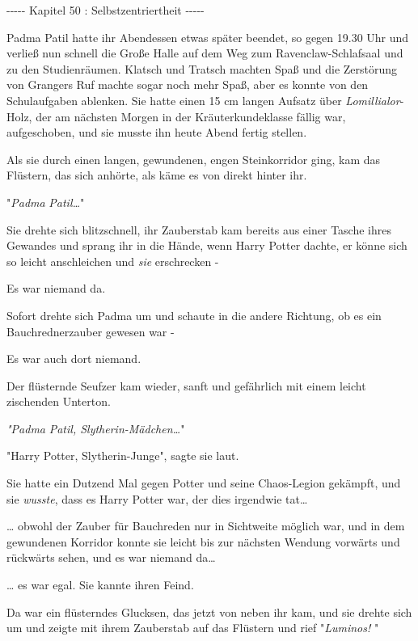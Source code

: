 

\hypertarget{selbstzentriertheit}{%

-\/-\/-\/-\/- Kapitel 50 : Selbstzentriertheit -\/-\/-\/-\/-

Padma Patil hatte ihr Abendessen etwas später beendet, so gegen 19.30 Uhr und verließ nun schnell die Große Halle auf dem Weg zum Ravenclaw-Schlafsaal und zu den Studienräumen. Klatsch und Tratsch machten Spaß und die Zerstörung von Grangers Ruf machte sogar noch mehr Spaß, aber es konnte von den Schulaufgaben ablenken. Sie hatte einen 15 cm langen Aufsatz über \emph{Lomillialor}-Holz, der am nächsten Morgen in der Kräuterkundeklasse fällig war, aufgeschoben, und sie musste ihn heute Abend fertig stellen.

Als sie durch einen langen, gewundenen, engen Steinkorridor ging, kam das Flüstern, das sich anhörte, als käme es von direkt hinter ihr.

"\emph{Padma} \emph{Patil…}"

Sie drehte sich blitzschnell, ihr Zauberstab kam bereits aus einer Tasche ihres Gewandes und sprang ihr in die Hände, wenn Harry Potter dachte, er könne sich so leicht anschleichen und \emph{sie} erschrecken -

Es war niemand da.

Sofort drehte sich Padma um und schaute in die andere Richtung, ob es ein Bauchrednerzauber gewesen war -

Es war auch dort niemand.

Der flüsternde Seufzer kam wieder, sanft und gefährlich mit einem leicht zischenden Unterton.

\emph{"Padma} \emph{Patil, Slytherin-Mädchen…}"

"Harry Potter, Slytherin-Junge", sagte sie laut.

Sie hatte ein Dutzend Mal gegen Potter und seine Chaos-Legion gekämpft, und sie \emph{wusste}, dass es Harry Potter war, der dies irgendwie tat…

… obwohl der Zauber für Bauchreden nur in Sichtweite möglich war, und in dem gewundenen Korridor konnte sie leicht bis zur nächsten Wendung vorwärts und rückwärts sehen, und es war niemand da…

… es war egal. Sie kannte ihren Feind.

Da war ein flüsterndes Glucksen, das jetzt von neben ihr kam, und sie drehte sich um und zeigte mit ihrem Zauberstab auf das Flüstern und rief "\emph{Luminos!} "

}
